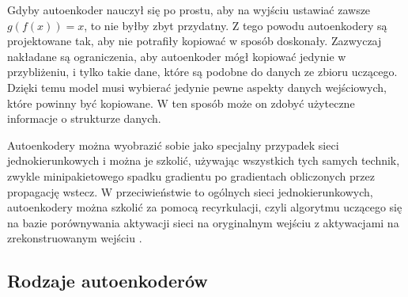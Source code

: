 \documentclass[12pt]{mwbk}
\theoremstyle{plain}
\theoremstyle{definition}
\theoremstyle{remark}
\begin{document}
Gdyby autoenkoder nauczył się po prostu, aby na wyjściu ustawiać zawsze $g(f(x))=x$, to nie byłby zbyt przydatny. Z tego powodu autoenkodery są projektowane tak, aby nie potrafiły kopiować w sposób doskonały. Zazwyczaj nakładane są ograniczenia, aby autoenkoder mógł kopiować jedynie w przybliżeniu, i tylko takie dane, które są podobne do danych ze zbioru uczącego. Dzięki temu model musi wybierać jedynie pewne aspekty danych wejściowych, które powinny być kopiowane. W ten sposób może on zdobyć użyteczne informacje o strukturze danych.





Autoenkodery można wyobrazić sobie jako specjalny przypadek sieci jednokierunkowych i można je szkolić, używając wszystkich tych samych technik, zwykle minipakietowego spadku gradientu po gradientach obliczonych przez propagację wstecz. W przeciwieństwie to ogólnych sieci jednokierunkowych, autoenkodery można szkolić za pomocą recyrkulacji, czyli algorytmu uczącego się na bazie porównywania aktywacji sieci na oryginalnym wejściu z aktywacjami na zrekonstruowanym wejściu \cite{goodfellow}. 

\subsection{Rodzaje autoenkoderów}
\end{document}
